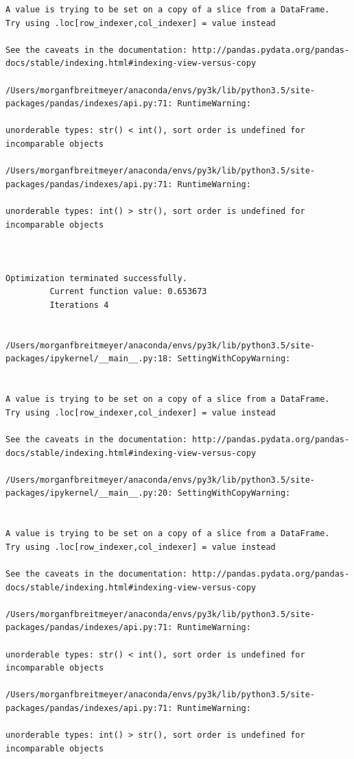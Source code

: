 \begin{lstlisting}
A value is trying to be set on a copy of a slice from a DataFrame.
Try using .loc[row_indexer,col_indexer] = value instead

See the caveats in the documentation: http://pandas.pydata.org/pandas-docs/stable/indexing.html#indexing-view-versus-copy

/Users/morganfbreitmeyer/anaconda/envs/py3k/lib/python3.5/site-packages/pandas/indexes/api.py:71: RuntimeWarning:

unorderable types: str() < int(), sort order is undefined for incomparable objects

/Users/morganfbreitmeyer/anaconda/envs/py3k/lib/python3.5/site-packages/pandas/indexes/api.py:71: RuntimeWarning:

unorderable types: int() > str(), sort order is undefined for incomparable objects



Optimization terminated successfully.
         Current function value: 0.653673
         Iterations 4


/Users/morganfbreitmeyer/anaconda/envs/py3k/lib/python3.5/site-packages/ipykernel/__main__.py:18: SettingWithCopyWarning:


A value is trying to be set on a copy of a slice from a DataFrame.
Try using .loc[row_indexer,col_indexer] = value instead

See the caveats in the documentation: http://pandas.pydata.org/pandas-docs/stable/indexing.html#indexing-view-versus-copy

/Users/morganfbreitmeyer/anaconda/envs/py3k/lib/python3.5/site-packages/ipykernel/__main__.py:20: SettingWithCopyWarning:


A value is trying to be set on a copy of a slice from a DataFrame.
Try using .loc[row_indexer,col_indexer] = value instead

See the caveats in the documentation: http://pandas.pydata.org/pandas-docs/stable/indexing.html#indexing-view-versus-copy

/Users/morganfbreitmeyer/anaconda/envs/py3k/lib/python3.5/site-packages/pandas/indexes/api.py:71: RuntimeWarning:

unorderable types: str() < int(), sort order is undefined for incomparable objects

/Users/morganfbreitmeyer/anaconda/envs/py3k/lib/python3.5/site-packages/pandas/indexes/api.py:71: RuntimeWarning:

unorderable types: int() > str(), sort order is undefined for incomparable objects




\end{lstlisting}

